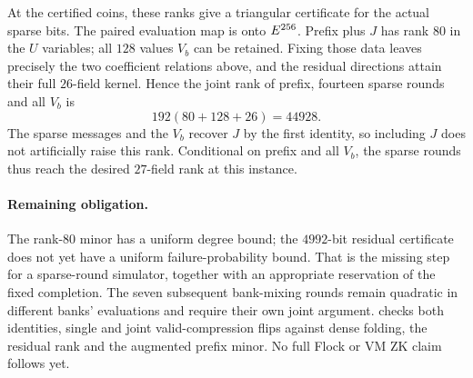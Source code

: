 \documentclass[11pt]{article}
\begin{document}
At the certified coins, these ranks give a triangular certificate for the actual sparse bits. The paired evaluation map is onto $E^{256}$. Prefix plus $J$ has rank $80$ in the $U$ variables; all $128$ values $V_b$ can be retained. Fixing those data leaves precisely the two coefficient relations above, and the residual directions attain their full $26$-field kernel. Hence the joint rank of prefix, fourteen sparse rounds and all $V_b$ is
\[
 192(80+128+26)=44928.
\]
The sparse messages and the $V_b$ recover $J$ by the first identity, so including $J$ does not artificially raise this rank. Conditional on prefix and all $V_b$, the sparse rounds thus reach the desired $27$-field rank at this instance.

\paragraph{Remaining obligation.} The rank-$80$ minor has a uniform degree bound; the $4992$-bit residual certificate does not yet have a uniform failure-probability bound. That is the missing step for a sparse-round simulator, together with an appropriate reservation of the fixed completion. The seven subsequent bank-mixing rounds remain quadratic in different banks' evaluations and require their own joint argument.  checks both identities, single and joint valid-compression flips against dense folding, the residual rank and the augmented prefix minor. No full Flock or VM ZK claim follows yet.
\end{document}
